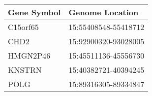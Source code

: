 \begin{tabular}{ll}
\toprule
Gene Symbol &      Genome Location \\
\midrule
   C15orf65 & 15:55408548-55418712 \\
       CHD2 & 15:92900320-93028005 \\
   HMGN2P46 & 15:45511136-45556730 \\
     KNSTRN & 15:40382721-40394245 \\
       POLG & 15:89316305-89334847 \\
\bottomrule
\end{tabular}
